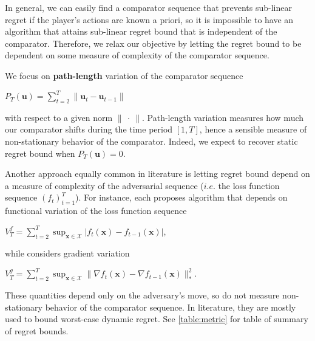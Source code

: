 \documentclass[12pt, a4paper]{report}
\begin{document}
In general, we can easily find a comparator sequence that prevents sub-linear regret if the player's actions are known a priori, so it is impossible to have an algorithm that attains sub-linear regret bound that is independent of the comparator.
Therefore, we relax our objective by letting the regret bound to be dependent on some measure of complexity of the comparator sequence. 

We focus on \textbf{path-length} variation of the comparator sequence
\begin{center}
    $\displaystyle P_T(\mathbf{u}) = \sum_{t=2}^{T} \lVert \mathbf{u}_t - \mathbf{u}_{t-1} \rVert$
\end{center}
with respect to a given norm $\lVert\ \cdot\ \rVert$. Path-length variation measures how much our comparator shifts during the time period $[1, T]$, hence a sensible measure of non-stationary behavior of the comparator. Indeed, we expect to recover static regret bound when $P_T(\mathbf{u}) = 0$. 

Another approach equally common in literature is letting regret bound depend on a measure of complexity of the adversarial sequence ($i.e.$ the loss function sequence $(f_t)_{t=1}^T$). 
For instance, \cite{Besbes2015Nonstationary, Jadbabaie2015OnlineO, Yang2016TrackingSM} each proposes algorithm that depends on functional variation of the loss function sequence
\begin{center}
    $\displaystyle V_T^f = \sum_{t=2}^T \sup_{\mathbf{x} \in \mathcal{X}} | f_t(\mathbf{x}) - f_{t-1}(\mathbf{x})|$,
\end{center}
while \cite{Chiang2013BeatingBI} considers gradient variation
\begin{center}
    $\displaystyle V_T^g = \sum_{t=2}^T \sup_{\mathbf{x} \in \mathcal{X}} \lVert \nabla f_t(\mathbf{x}) - \nabla f_{t-1}(\mathbf{x}) \rVert_{*}^2$.
\end{center}
These quantities depend only on the adversary's move, so do not measure non-stationary behavior of the comparator sequence. In literature, they are mostly used to bound worst-case dynamic regret. See \ref{table:metric} for table of summary of regret bounds.
\end{document}
